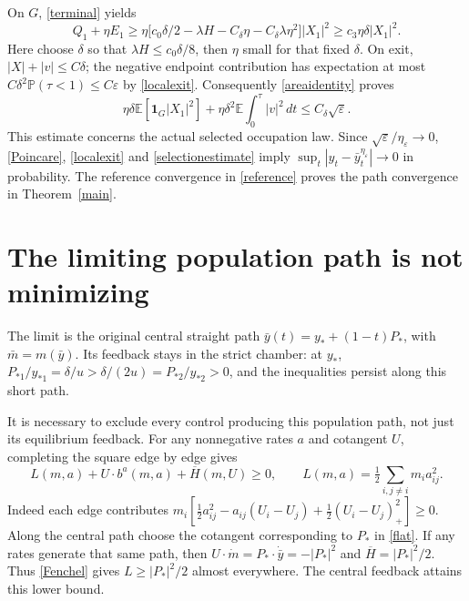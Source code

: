 \documentclass[11pt,a4paper]{article}
\newcommand{\E}{\mathbb E}
\newcommand{\PP}{\mathbb P}
\newcommand{\Hb}{\overline H}
\newcommand{\one}{\mathbf 1}
\newcommand{\dt}{\,dt}
\begin{document}
On $G$, \eqref{terminal} yields
\[
 Q_1+\eta E_1
 \geq\eta\big[c_0\delta/2-\lambda H
                   -C_\delta\eta-C_\delta\lambda\eta^2\big]|X_1|^2
 \geq c_3\eta\delta|X_1|^2.
\]
Here choose $\delta$ so that $\lambda H\leq c_0\delta/8$, then
$\eta$ small for that fixed $\delta$. On exit, $|X|+|v|\leq C\delta$;
the negative endpoint contribution has expectation at most
$C\delta^2\PP(\tau<1)\leq C\varepsilon$ by \eqref{localexit}.
Consequently \eqref{areaidentity} proves
\begin{equation}\label{selectionestimate}
 \eta\delta\E[\one_G|X_1|^2]
       +\eta\delta^2\E\int_0^\tau|v|^2\dt
             \leq C_\delta\sqrt\varepsilon.
\end{equation}
This estimate concerns the actual selected occupation law.
Since $\sqrt\varepsilon/\eta_\varepsilon\to0$, \eqref{Poincare},
\eqref{localexit} and \eqref{selectionestimate} imply
$\sup_t|y_t-\bar y^{\eta_\varepsilon}_t|\to0$ in probability.
The reference convergence in \eqref{reference} proves the path
convergence in Theorem~\ref{main}.

\section{The limiting population path is not minimizing}
The limit is the original central straight path
$\bar y(t)=y_*+(1-t)P_*$, with $\bar m=m(\bar y)$.
Its feedback stays in the strict chamber: at $y_*$,
$P_{*1}/y_{*1}=\delta/u>\delta/(2u)=P_{*2}/y_{*2}>0$,
and the inequalities persist along this short path.

It is necessary to exclude every control producing this population
path, not just its equilibrium feedback. For any nonnegative rates
$a$ and cotangent $U$, completing the square edge by edge gives
\begin{equation}\label{Fenchel}
 L(m,a)+U\cdot b^a(m,a)+\Hb(m,U)\geq0,
 \qquad L(m,a)=\tfrac12\sum_{i,j\ne i}m_i a_{ij}^2.
\end{equation}
Indeed each edge contributes
$m_i[\tfrac12a_{ij}^2-a_{ij}(U_i-U_j)
+\tfrac12(U_i-U_j)_+^2]\geq0$.
Along the central path choose the cotangent corresponding to $P_*$
in \eqref{flat}. If any rates generate that same path, then
$U\cdot\dot m=P_*\cdot\dot{\bar y}=-|P_*|^2$ and
$\Hb=|P_*|^2/2$. Thus \eqref{Fenchel} gives
$L\geq|P_*|^2/2$ almost everywhere. The central feedback attains
this lower bound.
\end{document}
